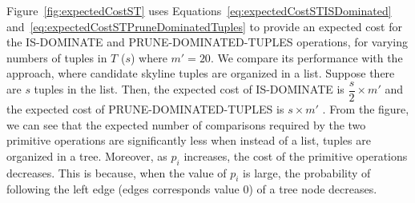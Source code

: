 Figure~\ref{fig:expectedCostST}
uses Equations~\ref{eq:expectedCostSTISDominated} and~\ref{eq:expectedCostSTPruneDominatedTuples} to provide an expected cost for the IS-DOMINATE and PRUNE-DOMINATED-TUPLES operations, for varying numbers of tuples in $T$ ($s$) where $m'=20$.
We compare its performance with the approach, where candidate skyline tuples are organized in a list. Suppose there are $s$ tuples in the list. 
Then, the expected cost of IS-DOMINATE is $\dfrac{s}{2}\times m'$ and the expected cost of PRUNE-DOMINATED-TUPLES is $s \times m'$ \cite{TechReport}. From the figure, we can see that the expected number of comparisons required by the two primitive operations are significantly less when instead of a list, tuples are organized in a tree. Moreover, as $p_i$ increases, the cost of the primitive operations decreases. This is because, when the value of $p_i$ is large, the probability of following the left edge (edges corresponds value $0$) of a tree node decreases. 



